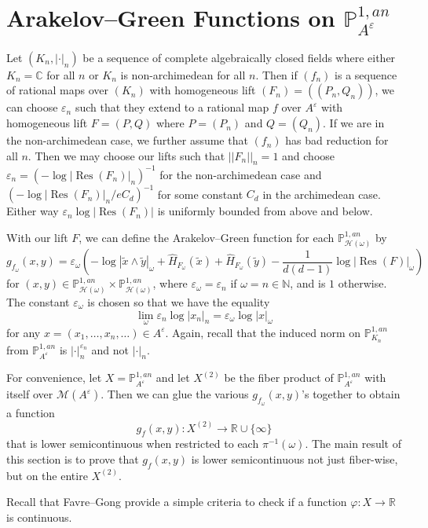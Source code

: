 \documentclass[10pt]{amsart}
\newcommand{\bb}{\mathbb}
\newcommand{\vphi}{\varphi}
\newcommand{\Res}{\operatorname{Res}}
\newcommand{\berkP}{\mathbb{P}^{1,an}}
\newcommand{\cal}{\mathcal}
\newcommand{\eps}{\varepsilon}
\newcommand{\Ht}{\widehat{H}}
\numberwithin{theorem}{section}
\numberwithin{example}{section}
\numberwithin{definition}{section}
\begin{document}
\section{Arakelov--Green Functions on $\berkP_{A^{\eps}}$} Let $(K_n, | \cdot |_n)$ be a sequence of complete algebraically closed fields where either $K_n = \bb{C}$ for all $n$ or $K_n$ is non-archimedean for all $n$. Then if $(f_n)$ is a sequence of rational maps over $(K_n)$ with homogeneous lift $(F_n) = ((P_n,Q_n))$, we can choose $\eps_n$ such that they extend to a rational map $f$ over $A^{\eps}$ with homogeneous lift $F = (P,Q)$ where $P = (P_n)$ and $Q = (Q_n)$. If we are in the non-archimedean case, we further assume that $(f_n)$ has bad reduction for all $n$. Then we may choose our lifts such that $||F_n||_n = 1$ and choose $\eps_n = (-\log |\Res(F_n)|_n)^{-1}$ for the non-archimedean case and $(-\log |\Res(F_n)|_n/eC_d)^{-1}$ for some constant $C_d$ in the archimedean case. Either way $\eps_n \log |\Res(F_n)|$ is uniformly bounded from above and below.  
\par 
With our lift $F$, we can define the Arakelov--Green function for each $\berkP_{\cal{H}(\omega)}$ by 
$$g_{f_{\omega}}(x,y) = \eps_{\omega} \left(-\log |\tilde{x} \wedge \tilde{y}|_{\omega} + \Ht_{F_{\omega}}(\tilde{x}) + \Ht_{F_{\omega}}(\tilde{y}) - \frac{1}{d(d-1)} \log |\Res(F)|_{\omega} \right)$$
for $(x,y) \in \berkP_{\cal{H}(\omega)} \times \berkP_{\cal{H}(\omega)}$,
where $\eps_{\omega} = \eps_n$ if $\omega = n \in \bb{N}$, and is $1$ otherwise. The constant $\eps_{\omega}$ is chosen so that we have the equality 
$$\lim_{\omega} \eps_n \log |x_n|_n = \eps_{\omega} \log |x|_{\omega}$$
for any $x = (x_1,\ldots,x_n,\ldots) \in A^{\eps}$. Again, recall that the induced norm on $\berkP_{K_n}$ from $\berkP_{A^{\eps}}$ is $| \cdot |_n^{\eps_n}$ and not $| \cdot |_n$. 
\par 
For convenience, let $X = \berkP_{A^{\eps}}$ and let $X^{(2)}$ be the fiber product of $\berkP_{A^{\eps}}$ with itself over $\cal{M}(A^{\eps})$. Then we can glue the various $g_{f_{\omega}}(x,y)$'s together to obtain a function
$$g_f(x,y): X^{(2)} \to \bb{R} \cup \{\infty\}$$
that is lower semicontinuous when restricted to each $\pi^{-1}(\omega)$. The main result of this section is to prove that $g_f(x,y)$ is lower semicontinuous not just fiber-wise, but on the entire $X^{(2)}$. 
\par 
Recall that Favre--Gong \cite[Lemma 4.14]{FG24} provide a simple criteria to check if a function $\vphi: X \to \bb{R}$ is continuous. 
\end{document}
